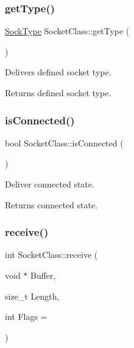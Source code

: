 \subsubsection{\texorpdfstring{get\+Type()}{getType()}}
{\footnotesize\ttfamily \hyperlink{classSocketClass_a2182dd9fee09459fabb99e6ae717f595}{Sock\+Type} Socket\+Class\+::get\+Type (\begin{DoxyParamCaption}{ }\end{DoxyParamCaption})\hspace{0.3cm}{\ttfamily [inline]}}

Delivers defined socket type. \begin{DoxyReturn}{Returns}
defined socket type. 
\end{DoxyReturn}
\mbox{\label{classSocketClass_a00d9b8d98e62c1c239fe35fb15f35fda}} 
\subsubsection{\texorpdfstring{is\+Connected()}{isConnected()}}
{\footnotesize\ttfamily bool Socket\+Class\+::is\+Connected (\begin{DoxyParamCaption}{ }\end{DoxyParamCaption})\hspace{0.3cm}{\ttfamily [inline]}}

Deliver connected state. \begin{DoxyReturn}{Returns}
connected state. 
\end{DoxyReturn}
\mbox{\label{classSocketClass_a065cdcd833f0688b6d6bdca6ed92e27b}} 
\subsubsection{\texorpdfstring{receive()}{receive()}}
{\footnotesize\ttfamily int Socket\+Class\+::receive (\begin{DoxyParamCaption}\item[{void $\ast$}]{Buffer,  }\item[{size\+\_\+t}]{Length,  }\item[{int}]{Flags = {} }\end{DoxyParamCaption})\hspace{0.3cm}{\ttfamily [virtual]}}

